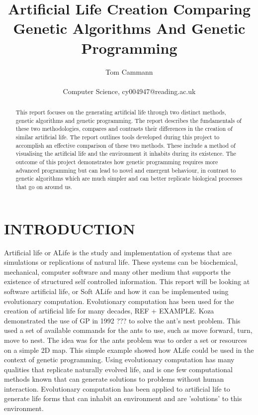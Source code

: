 \documentclass[10pt,twocolumn]{article}
\begin{document}
\title{Artificial Life Creation Comparing Genetic Algorithms And Genetic Programming}
\author{Tom Cammann\\\\
Computer Science, cy004947@reading.ac.uk}
\date{}
\maketitle
\begin{abstract}
This report focuses on the generating artificial life through two distinct methods, genetic algorithms and genetic programming. The report describes the fundamentals of these two methodologies, compares and contrasts their differences in the creation of similar artificial life. The report outlines tools developed during this project to accomplish an effective comparison of these two methods. These include a method of visualising the artificial life and the environment it inhabits during its existence. The outcome of this project demonstrates how genetic programming requires more advanced programming but can lead to novel and emergent behaviour, in contrast to genetic algorithms which are much simpler and can better replicate biological processes that go on around us. 
\end{abstract}


\section{INTRODUCTION}

Artificial life or ALife is the study and implementation of systems that are simulations or replications of natural life.
These systems can be biochemical, mechanical, computer software and many other medium that supports the existence of structured self controlled information.
This report will be looking at software artificial life, or Soft ALife and how it can be implemented using evolutionary computation.
Evolutionary computation has been used for the creation of artificial life for many decades, REF + EXAMPLE. Koza demonstrated the use of GP in 1992 ??? to solve the ant's nest problem. This used a set
of available commands for the ants to use, such as move forward, turn, move to nest. The idea was for
the ants problem was to order a set or resources on a simple 2D map. This simple example showed how ALife could
be used in the context of genetic programming.
Using evolutionary computation has many qualities that replicate naturally evolved life, and is one few computational methods known that can generate solutions to problems without human interaction.
Evolutionary computation has been applied to artificial life to generate life forms that can inhabit an environment and are 'solutions' to this environment.
\end{document}
